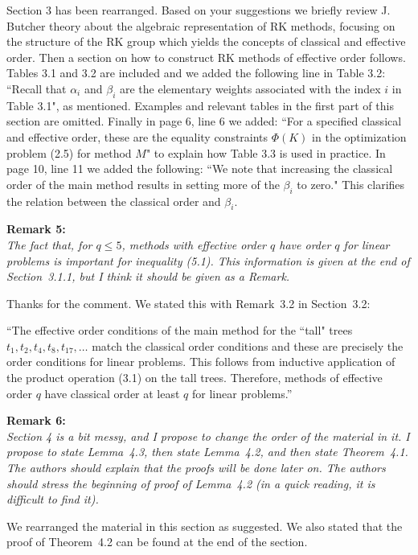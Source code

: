 \documentclass[12pt]{article}
\newcommand{\remark}[2]{\vspace{25pt} \noindent \textbf{Remark #1:\newline} \textit{#2}\vspace{15pt}}
\renewcommand{\newline}{\vspace{15pt}\\}
\newcommand{\david}[1]{\textcolor{red}{\\\textbf{D: \footnotesize #1}\\}}
\begin{document}
Section 3 has been rearranged. 
Based on your suggestions we briefly review J. Butcher theory about the algebraic representation
of RK methods, focusing on the structure of the RK group which yields the concepts of classical 
and effective order.
Then a section on how to construct RK methods of effective order follows.
Tables 3.1 and 3.2 are included and we added the following line in Table 3.2:
``Recall that $\alpha_i$ and $\beta_i$ are the elementary weights associated 
with the index $i$ in Table 3.1",
as mentioned.
Examples and relevant tables in the first part of this section are omitted. 
Finally in page 6, line 6 we added:
``For a specified classical and effective order, these are the equality constraints
$\Phi(K)$ in the optimization problem (2.5) for method $M$"
to explain how Table 3.3 is used in practice.
In page 10, line 11 we added the following:
``We note that increasing the classical order of the main method results
in setting more of the $\beta_i$ to zero."
This clarifies the relation between the classical order and $\beta_i$.

\pagebreak

\remark{5}{
The fact that, for $q \leq 5$, methods with effective order $q$ have order $q$ 
for linear problems is important for inequality (5.1). 
This information is given at the end of Section~3.1.1, but I think it should be given as a Remark.}

Thanks for the comment. We stated this with Remark~3.2 in Section~3.2:

``The effective order conditions of the main method for the ``tall" trees 
$t_1, t_2, t_4, t_8, t_{17}, \dots$ match the classical order conditions
and these are precisely the order conditions for linear problems.
This follows from inductive application of the product operation (3.1)
on the tall trees. 
Therefore, methods of effective order $q$ have classical order at least $q$ 
for linear problems.''

\remark{6}{
Section 4 is a bit messy, and I propose to change the order of the material in it. 
I propose to state Lemma~4.3, then state Lemma~4.2, and then state Theorem~4.1. 
The authors should explain that the proofs will be done later on. 
The authors should stress the beginning of proof of Lemma~4.2 (in a quick reading, 
it is difficult to find it).}

We rearranged the material in this section as suggested.
We also stated that the proof of Theorem~4.2 can be found at the end of the section.

\end{document}
